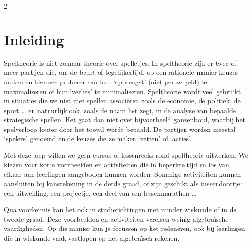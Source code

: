 

\startcontents[inhoudloep]	%

\begin{multicols}{2}

\inhoudstafelloep			%


\section{Inleiding}


Speltheorie is niet zomaar theorie over spelletjes. In speltheorie zijn er twee of meer partijen die, om de beurt of tegelijkertijd, op een rationele manier keuzes maken en hiermee proberen om hun `opbrengst' (niet per se geld) te maximaliseren of hun `verlies' te minimaliseren. Speltheorie wordt veel gebruikt in situaties die we niet met spellen associëren zoals de economie, de politiek, de sport … en natuurlijk ook, zoals de naam het zegt, in de analyse van bepaalde strategische spellen. Het gaat dan niet over bijvoorbeeld ganzenbord, waarbij het spelverloop louter door het toeval wordt bepaald. De partijen worden meestal `spelers' genoemd en de keuzes die ze maken `zetten' of `acties'.

Met deze loep willen we geen cursus of lessenreeks rond speltheorie uitwerken. We kiezen voor korte voorbeelden en activiteiten die in beperkte tijd en los van elkaar aan leerlingen aangeboden kunnen worden. Sommige activiteiten kunnen aansluiten bij kansrekening in de derde graad, of zijn geschikt als tussendoortje: een uitweiding, een projectje, een deel van een lessenmarathon …

Qua voorkennis kan het ook in studierichtingen met minder wiskunde of in de tweede graad. Deze voorbeelden en activiteiten vereisen weinig algebraïsche vaardigheden. Op die manier kun je focussen op het redeneren, ook bij leerlingen die in wiskunde vaak vastlopen op het algebraïsch rekenen.


\end{multicols}
